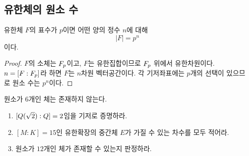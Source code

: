 \subsection{유한체의 원소 수}

\begin{proposition}
유한체 $F$의 표수가 $p$이면 어떤 양의 정수 $n$에 대해
\[
  |F|=p^n
\]
이다.
\end{proposition}

\begin{proof}
$F$의 소체는 $F_p$이고, $F$는 유한집합이므로 $F_p$ 위에서 유한차원이다. $n=[F:F_p]$라 하면 $F$는 $n$차원 벡터공간이다. 각 기저좌표에는 $p$개의 선택이 있으므로 원소 수는 $p^n$이다.
\end{proof}

\begin{corollary}
원소가 $6$개인 체는 존재하지 않는다.
\end{corollary}

\begin{checkpoint}
\begin{enumerate}[label=(\alph*)]
  \item $[Q(\sqrt2):Q]=2$임을 기저로 증명하라.
  \item $[M:K]=15$인 유한확장의 중간체 $E$가 가질 수 있는 차수를 모두 적어라.
  \item 원소가 $12$개인 체가 존재할 수 있는지 판정하라.
\end{enumerate}
\end{checkpoint}
